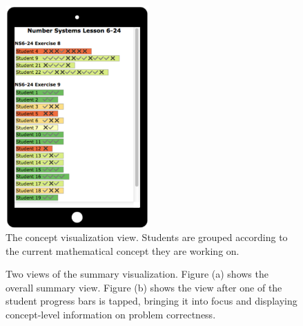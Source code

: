 \documentclass{sigchi}
\begin{document}
\begin{figure}[t]
\centering
\includegraphics[width=55mm]{images/ConceptVisualization.pdf}
\caption{The concept visualization view. Students are grouped according to the current mathematical concept they are working on.}
\label{fig:ConceptVisualization}
\end{figure}

\begin{figure}[t]
\centering
{} \hspace{1em}%
 \hspace{1em}%
\caption{Two views of the summary visualization. Figure (a) shows the overall summary view. Figure (b) shows the view after one of the student progress bars is tapped, bringing it into focus and displaying concept-level information on problem correctness. }
\label{fig:Spreadsheet}
\end{figure}
\end{document}

